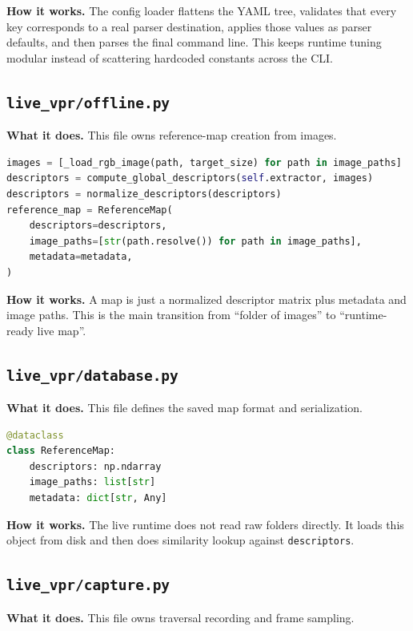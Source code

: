 \documentclass[11pt]{article}
\newcommand{\file}[1]{\texttt{#1}}
\begin{document}
\textbf{How it works.} The config loader flattens the YAML tree, validates that every key corresponds to a real parser destination, applies those values as parser defaults, and then parses the final command line. This keeps runtime tuning modular instead of scattering hardcoded constants across the CLI.

\subsection{\file{live\_vpr/offline.py}}
\textbf{What it does.} This file owns reference-map creation from images.

\begin{lstlisting}[style=repo, language=Python, caption={Core map-building loop}]
images = [_load_rgb_image(path, target_size) for path in image_paths]
descriptors = compute_global_descriptors(self.extractor, images)
descriptors = normalize_descriptors(descriptors)
reference_map = ReferenceMap(
    descriptors=descriptors,
    image_paths=[str(path.resolve()) for path in image_paths],
    metadata=metadata,
)
\end{lstlisting}

\textbf{How it works.} A map is just a normalized descriptor matrix plus metadata and image paths. This is the main transition from ``folder of images'' to ``runtime-ready live map''.

\subsection{\file{live\_vpr/database.py}}
\textbf{What it does.} This file defines the saved map format and serialization.

\begin{lstlisting}[style=repo, language=Python, caption={ReferenceMap is the live system's central data object}]
@dataclass
class ReferenceMap:
    descriptors: np.ndarray
    image_paths: list[str]
    metadata: dict[str, Any]
\end{lstlisting}

\textbf{How it works.} The live runtime does not read raw folders directly. It loads this object from disk and then does similarity lookup against \texttt{descriptors}.

\subsection{\file{live\_vpr/capture.py}}
\textbf{What it does.} This file owns traversal recording and frame sampling.
\end{document}

